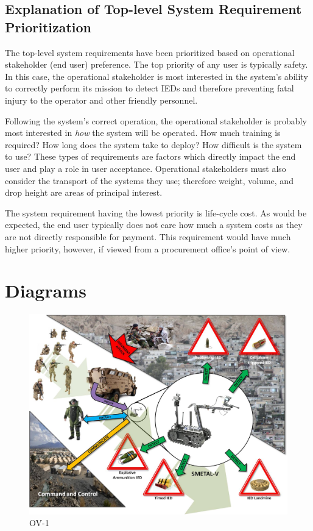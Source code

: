 \documentclass[letterpaper,10pt]{article}
\begin{document}
\subsection{Explanation of Top-level System Requirement Prioritization}
The top-level system requirements have been prioritized based on operational stakeholder (end user) preference. The top priority of any user is typically safety. In this case, the operational stakeholder is most interested in the system's ability to correctly perform its mission to detect IEDs and therefore preventing fatal injury to the operator and other friendly personnel.

Following the system's correct operation, the operational stakeholder is probably most interested in \emph{how} the system will be operated. How much training is required? How long does the system take to deploy? How difficult is the system to use? These types of requirements are factors which directly impact the end user and play a role in user acceptance. Operational stakeholders must also consider the transport of the systems they use; therefore weight, volume, and drop height are areas of principal interest.

The system requirement having the lowest priority is life-cycle cost. As would be expected, the end user typically does not care how much a system costs as they are not directly responsible for payment. This requirement would have much higher priority, however, if viewed from a procurement office's point of view.

\section{Diagrams}
\begin{figure}[h!tbp]
	\begin{center}
		\includegraphics[scale=0.6]{ov1.jpg}
		\caption{OV-1}
	\end{center}
\end{figure}
\end{document}
